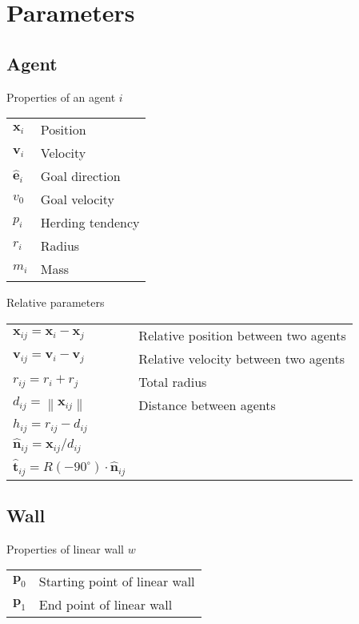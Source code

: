 \section{Parameters}
\subsection{Agent}
Properties of an agent $ i $
\begin{table}[H]
\begin{tabular}{ll}
$ \mathbf{x}_{i} $ & Position   \\ 
$ \mathbf{v}_{i} $ & Velocity  \\ 
$ \hat{\mathbf{e}}_{i} $ & Goal direction \\
$ v_0 $            & Goal velocity \\
$ p_i $            & Herding tendency \\
$ r_{i} $          & Radius  \\ 
$ m_{i} $          & Mass  \\ 
\end{tabular} 
\end{table}

Relative parameters
\begin{table}[H]
\begin{tabular}{ll}
$ \mathbf{x}_{ij} = \mathbf{x}_{i} - \mathbf{x}_{j} $ & Relative position between two agents \\
$ \mathbf{v}_{ij} = \mathbf{v}_{i} - \mathbf{v}_{j} $ & Relative velocity between two agents \\ 
$ r_{ij} = r_{i} + r_{j} $ & Total radius \\ 
$ d_{ij} = \left\|\mathbf{x}_{ij}\right\| $ & Distance between agents \\
$ h_{ij} = r_{ij} - d_{ij} $ &  \\
$ \hat{\mathbf{n}}_{ij} = \mathbf{x}_{ij} / d_{ij} $ &  \\ 
$ \hat{\mathbf{t}}_{ij} = R(-90^{\circ}) \cdot \hat{\mathbf{n}}_{ij} $ &  \\ 
\end{tabular} 
\end{table}

\subsection{Wall}
Properties of linear wall $ w $
\begin{table}[H]
\begin{tabular}{ll}
$ \mathbf{p}_{0} $ & Starting point of linear wall \\
$ \mathbf{p}_{1} $ & End point of linear wall \\
\end{tabular}
\end{table}

